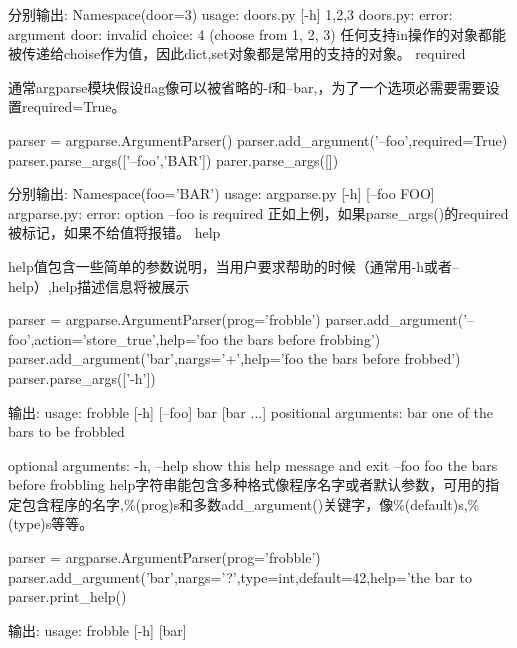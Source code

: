 分别输出:\newline
Namespace(door=3)\newline
usage: doors.py [-h] {1,2,3}\newline
doors.py: error: argument door: invalid choice: 4 (choose from 1, 2, 3)\newline
任何支持in操作的对象都能被传递给choise作为值，因此dict,set对象都是常用的支持的对象。
required\par
通常argparse模块假设flag像可以被省略的-f和--bar,，为了一个选项必需要需要设置required=True。
\begin{python}
parser = argparse.ArgumentParser()
parser.add_argument('--foo',required=True)
parser.parse_args(['--foo','BAR'])
parer.parse_args([])
\end{python}
分别输出:\newline
Namespace(foo='BAR')\newline
usage: argparse.py [-h] [--foo FOO]\newline
argparse.py: error: option --foo is required\newline
正如上例，如果parse\_args()的required被标记，如果不给值将报错。
help\par
help值包含一些简单的参数说明，当用户要求帮助的时候（通常用-h或者--help）,help描述信息将被展示
\begin{python}
parser = argparse.ArgumentParser(prog='frobble')
parser.add_argument('--foo',action='store_true',help='foo the bars before frobbing')
parser.add_argument('bar',nargs='+',help='foo the bars before frobbed')
parser.parse_args(['-h'])
\end{python}
输出:\newline
usage: frobble [-h] [--foo] bar [bar ...]\newline
positional arguments:\newline
 bar     one of the bars to be frobbled\newline

optional arguments:\newline
 -h, --help  show this help message and exit\newline
 --foo   foo the bars before frobbling\newline
help字符串能包含多种格式像程序名字或者默认参数，可用的指定包含程序的名字,\%(prog)s和多数add\_argument()关键字，像\%(default)s,\%(type)s等等。
\begin{python}
parser = argparse.ArgumentParser(prog='frobble')
parser.add_argument('bar',nargs='?',type=int,default=42,help='the bar to %
parser.print_help()
\end{python}
输出:\newline
usage: frobble [-h] [bar]\newline

